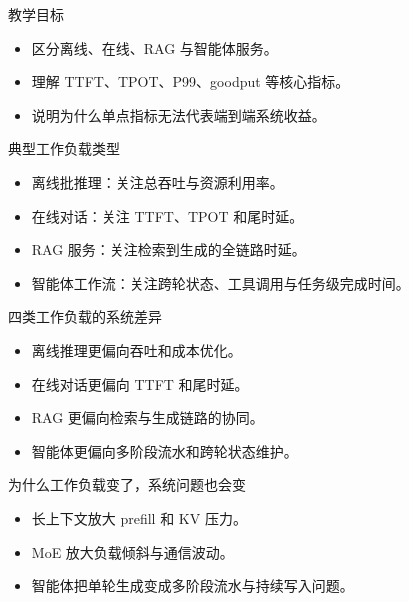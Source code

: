 




\begin{frame}[plain]
  \titlepage
\end{frame}

\begin{frame}{教学目标}
  \begin{itemize}
    \item 区分离线、在线、RAG 与智能体服务。
    \item 理解 TTFT、TPOT、P99、goodput 等核心指标。
    \item 说明为什么单点指标无法代表端到端系统收益。
  \end{itemize}
\end{frame}

\begin{frame}{典型工作负载类型}
  \begin{itemize}
    \item 离线批推理：关注总吞吐与资源利用率。
    \item 在线对话：关注 TTFT、TPOT 和尾时延。
    \item RAG 服务：关注检索到生成的全链路时延。
    \item 智能体工作流：关注跨轮状态、工具调用与任务级完成时间。
  \end{itemize}
\end{frame}

\begin{frame}{四类工作负载的系统差异}
  \begin{itemize}
    \item 离线推理更偏向吞吐和成本优化。
    \item 在线对话更偏向 TTFT 和尾时延。
    \item RAG 更偏向检索与生成链路的协同。
    \item 智能体更偏向多阶段流水和跨轮状态维护。
  \end{itemize}
\end{frame}

\begin{frame}{为什么工作负载变了，系统问题也会变}
  \begin{itemize}
    \item 长上下文放大 prefill 和 KV 压力。
    \item MoE 放大负载倾斜与通信波动。
    \item 智能体把单轮生成变成多阶段流水与持续写入问题。
  \end{itemize}
\end{frame}

